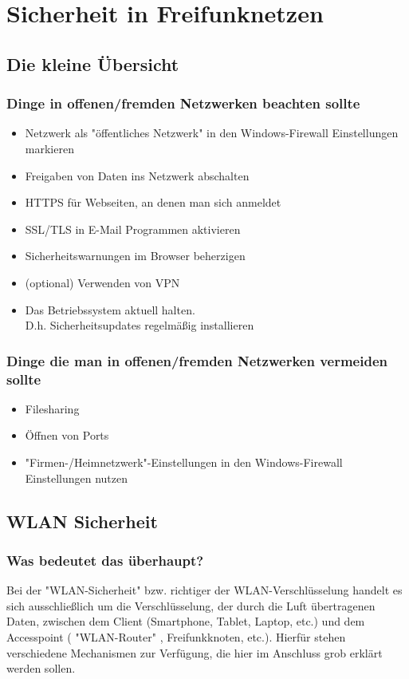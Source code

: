 \section{Sicherheit in Freifunknetzen}
\subsection{Die kleine Übersicht}

\subsubsection{Dinge in offenen/fremden Netzwerken beachten sollte}
\begin{itemize}
\item Netzwerk als  "öffentliches Netzwerk" in den Windows-Firewall Einstellungen\\ markieren
\item Freigaben von Daten ins Netzwerk abschalten
\item HTTPS für Webseiten, an denen man sich anmeldet
\item SSL/TLS in E-Mail Programmen aktivieren
\item Sicherheitswarnungen im Browser beherzigen
\item (optional) Verwenden von VPN
\item Das Betriebssystem aktuell halten. \\D.h. Sicherheitsupdates regelmäßig installieren
\end{itemize}

\subsubsection{Dinge die man in offenen/fremden Netzwerken vermeiden sollte}

\begin{itemize}
\item Filesharing
\item Öffnen von Ports
\item "Firmen-/Heimnetzwerk"-Einstellungen in den Windows-Firewall Einstellungen nutzen
\end{itemize}

\subsection{WLAN Sicherheit}
\subsubsection{Was bedeutet das überhaupt?}
Bei der  "WLAN-Sicherheit"  bzw. richtiger der WLAN-Verschlüsselung handelt es 
sich ausschließlich um die Verschlüsselung, der durch die Luft übertragenen 
Daten, zwischen dem Client (Smartphone, Tablet, Laptop, etc.) und dem 
Accesspoint ( "WLAN-Router" , Freifunkknoten, etc.). Hierfür stehen verschiedene 
Mechanismen zur Verfügung, die hier im Anschluss grob erklärt werden sollen.

